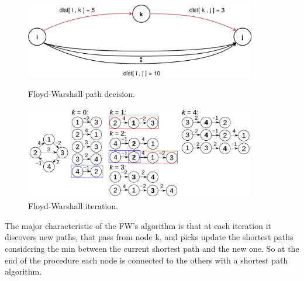 \documentclass[11pt,a4paper]{article}
\begin{document}
\begin{figure}[H]
	\begin{minipage}[t]{0.5\linewidth}
		\centering
		\includegraphics[width=0.9\textwidth]{img/FW_min.png}
		\caption{Floyd-Warshall path decision.}
		\label{f1}
	\end{minipage}
	\hspace{0.1cm}
	\begin{minipage}[t]{0.5\linewidth} 
		\centering
		\includegraphics[width=0.9\textwidth]{img/FW_iteration.png}
		\caption{Floyd-Warshall iteration.}
		\label{f2}
	\end{minipage}        
\end{figure}
The major characteristic of the FW's algorithm is that at each iteration it discovers new paths, that pass from node k, and picks update the shortest paths considering the min between the current shortest path and the new one. So at the end of the procedure each node is connected to the others with a shortest path algorithm.\\
\end{document}
